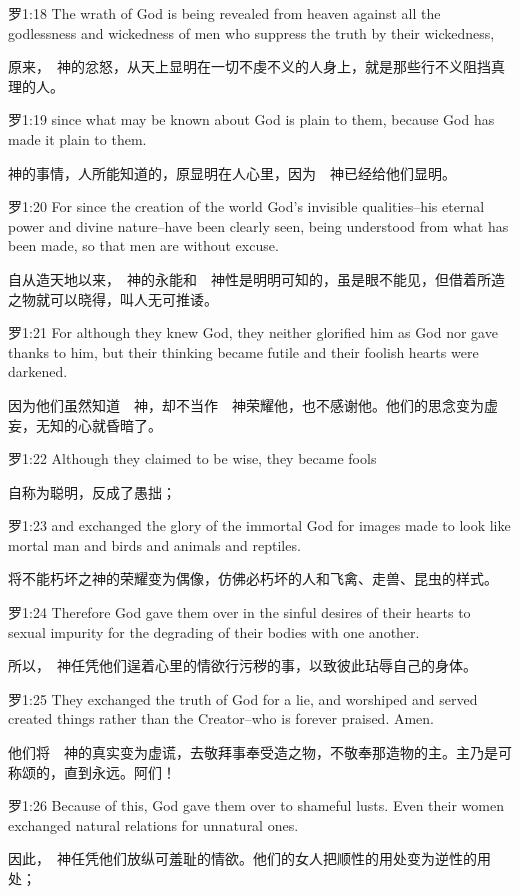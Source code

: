 \documentclass[a4paper,11pt,onecolumn,twoside]{ctexart}
\begin{document}
\begin{multicols}{2}
 罗1:18
 The wrath of God is being revealed from heaven against all the godlessness and wickedness of men who suppress the truth by their wickedness,

 原来，　神的忿怒，从天上显明在一切不虔不义的人身上，就是那些行不义阻挡真理的人。


 罗1:19
 since what may be known about God is plain to them, because God has made it plain to them.

 神的事情，人所能知道的，原显明在人心里，因为　神已经给他们显明。


 罗1:20
 For since the creation of the world God's invisible qualities--his eternal power and divine nature--have been clearly seen, being understood from what has been made, so that men are without excuse.

 自从造天地以来，　神的永能和　神性是明明可知的，虽是眼不能见，但借着所造之物就可以晓得，叫人无可推诿。


 罗1:21
 For although they knew God, they neither glorified him as God nor gave thanks to him, but their thinking became futile and their foolish hearts were darkened.

 因为他们虽然知道　神，却不当作　神荣耀他，也不感谢他。他们的思念变为虚妄，无知的心就昏暗了。


 罗1:22
 Although they claimed to be wise, they became fools

 自称为聪明，反成了愚拙；


 罗1:23
 and exchanged the glory of the immortal God for images made to look like mortal man and birds and animals and reptiles.

 将不能朽坏之神的荣耀变为偶像，仿佛必朽坏的人和飞禽、走兽、昆虫的样式。


 罗1:24
 Therefore God gave them over in the sinful desires of their hearts to sexual impurity for the degrading of their bodies with one another.

 所以，　神任凭他们逞着心里的情欲行污秽的事，以致彼此玷辱自己的身体。


 罗1:25
 They exchanged the truth of God for a lie, and worshiped and served created things rather than the Creator--who is forever praised. Amen.

 他们将　神的真实变为虚谎，去敬拜事奉受造之物，不敬奉那造物的主。主乃是可称颂的，直到永远。阿们！


 罗1:26
 Because of this, God gave them over to shameful lusts. Even their women exchanged natural relations for unnatural ones.

 因此，　神任凭他们放纵可羞耻的情欲。他们的女人把顺性的用处变为逆性的用处；



\end{multicols}
\end{document}
